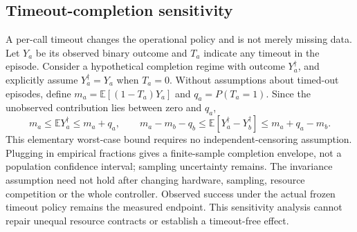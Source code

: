 \documentclass[11pt]{article}
\begin{document}
\subsection{Timeout-completion sensitivity}
A per-call timeout changes the operational policy and is not merely missing data. Let $Y_a$ be its observed binary outcome and $T_a$ indicate any timeout in the episode. Consider a hypothetical completion regime with outcome $Y_a^\dagger$, and explicitly assume $Y_a^\dagger=Y_a$ when $T_a=0$. Without assumptions about timed-out episodes, define $m_a=\mathbb E[(1-T_a)Y_a]$ and $q_a=P(T_a=1)$. Since the unobserved contribution lies between zero and $q_a$,
\[
m_a\leq\mathbb E Y_a^\dagger\leq m_a+q_a,
\qquad
m_a-m_b-q_b\leq\mathbb E[Y_a^\dagger-Y_b^\dagger]\leq m_a+q_a-m_b.
\]
This elementary worst-case bound requires no independent-censoring assumption. Plugging in empirical fractions gives a finite-sample completion envelope, not a population confidence interval; sampling uncertainty remains. The invariance assumption need not hold after changing hardware, sampling, resource competition or the whole controller. Observed success under the actual frozen timeout policy remains the measured endpoint. This sensitivity analysis cannot repair unequal resource contracts or establish a timeout-free effect.
\end{document}
